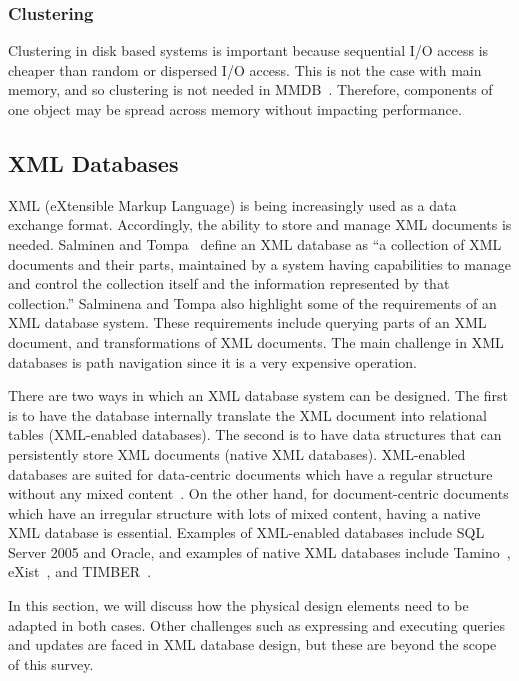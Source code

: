 \documentclass[12pt,a4paper]{article}
\begin{document}
\subsubsection{Clustering}
Clustering in disk based systems is important because sequential I/O access is cheaper than random or dispersed I/O access. This is not the case with main
memory, and so clustering is not needed in MMDB~\cite{garcia1992main, moldovan2008databases}. Therefore, components of one object may be spread across memory
without impacting performance.

\subsection{XML Databases}
\label{SEC-XML}

XML (eXtensible Markup Language) is being increasingly used as a data exchange format. Accordingly, the ability to store and manage XML documents is
needed.
Salminen and Tompa~\cite{salminen2001requirements} define an XML database as ``a collection of XML documents and their parts, maintained by a system
having capabilities to manage and control the collection itself and the information represented by that collection.'' Salminena and Tompa also highlight some of
the requirements of an XML database system. These requirements include querying parts of an XML document, and
transformations of XML documents. The main challenge in XML databases is path navigation since it is a very expensive operation.

There are two ways in which an XML database system can be designed. The first is to have the database internally translate the XML document into relational
tables (XML-enabled databases). The second is to have data structures that can persistently store XML documents (native XML databases). XML-enabled databases
are suited for data-centric documents which have a regular structure without any mixed content~\cite{bourret2003xml}. On the other hand, for document-centric
documents which have an irregular structure with lots of mixed content, having a native XML database is essential. Examples of XML-enabled databases include SQL
Server 2005 and Oracle, and examples of native XML databases include Tamino~\cite{taminodb},
eXist~\cite{meier2009exist}, and TIMBER~\cite{jagadish2002timber}.

In this section, we will discuss how the physical design elements need to be adapted in both cases. Other challenges such as expressing and executing queries
and updates are faced in XML database design, but these are beyond the scope of this survey.
\end{document}
